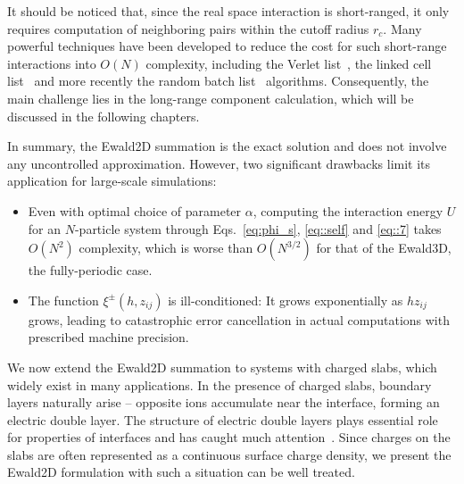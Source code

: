 It should be noticed that, since the real space interaction is short-ranged, it only requires computation of neighboring pairs within the cutoff radius $r_c$. 
Many powerful techniques have been developed to reduce the cost for such short-range interactions into $O(N)$ complexity, including the Verlet list~\cite{verlet1967computer}, the linked cell list~\cite{allen2017computer} and more recently the random batch list~\cite{liang2021random} algorithms. 
Consequently, the main challenge lies in the long-range component calculation, which will be discussed in the following chapters.

In summary, the Ewald2D summation is the exact solution and does not involve any uncontrolled approximation. 
However, two significant drawbacks limit its application for large-scale simulations:
\begin{itemize}
	\item Even with optimal choice of parameter $\alpha$, computing the interaction energy $U$ for an $N$-particle system through Eqs.~\eqref{eq:phi_s}, \eqref{eq::self} and \eqref{eq::7} takes $O(N^2)$ complexity, which is worse than $O(N^{3/2})$ for that of the Ewald3D, the fully-periodic case.
	\item The function $\xi^{\pm}(h, z_{ij})$ is ill-conditioned: It grows exponentially as $h z_{ij}$ grows, leading to catastrophic error cancellation in actual computations with prescribed machine precision.
\end{itemize}


We now extend the Ewald2D summation to systems with charged slabs, which widely exist in many applications.
In the presence of charged slabs, boundary layers naturally arise -- opposite ions accumulate near the interface, forming an electric double layer. The structure of electric double layers plays essential role for properties of interfaces and has caught much attention~\cite{messina2004effect,breitsprecher2014coarse,moreira2002simulations}. Since charges on the slabs are often represented as a continuous surface charge density, we present the Ewald2D formulation with such a situation can be well treated.

